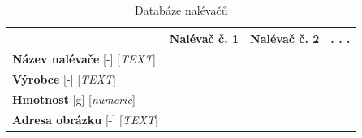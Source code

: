 \begin{table} [!h]
    \centering
    \begin{tabular}{|l|l|l|l|}
    \hline
         & Nalévač č. 1 & Nalévač č. 2 &  . . .\\ \hline
         \textbf{Název nalévače} [-] [\textit{TEXT}] & & &\\ \hline
         \textbf{Výrobce} [-] [\textit{TEXT}] & & &\\ \hline
         \textbf{Hmotnost} [g] [\textit{numeric}] & & &\\ \hline
         \textbf{Adresa obrázku} [-] [\textit{TEXT}] & & &\\ \hline
    \end{tabular}
    \caption{Databáze nalévačů}
    \label{tab:my_label}
\end{table}

